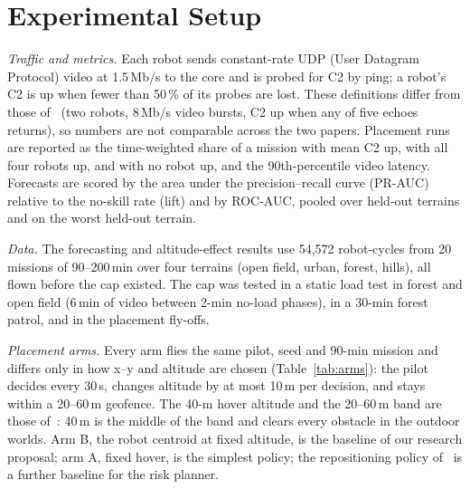 \section{Experimental Setup}
\label{sec:setup}

\textit{Traffic and metrics.} Each robot sends constant-rate UDP (User Datagram Protocol) video at
1.5\,Mb/s to the core and is probed for C2 by ping; a robot's C2 is up when
fewer than 50\,\% of its probes are lost. These definitions differ from those
of~\cite{makhubela2026satnac} (two robots, 8\,Mb/s video bursts, C2 up when
any of five echoes returns), so numbers are not comparable across the two
papers. Placement runs are reported as the time-weighted share of a mission
with mean C2 up, with all four robots up, and with no robot up, and the
90th-percentile video latency. Forecasts are scored by the area under the
precision--recall curve (PR-AUC) relative to the no-skill rate (lift) and by ROC-AUC, pooled over held-out terrains and on the
worst held-out terrain.

\textit{Data.} The forecasting and altitude-effect results use 54,572
robot-cycles from 20 missions of 90--200\,min over four terrains (open field,
urban, forest, hills), all flown before the cap existed. The cap was tested in
a static load test in forest and open field (6\,min of video between 2-min
no-load phases), in a 30-min forest patrol, and in the placement fly-offs.

\textit{Placement arms.} Every arm flies the same pilot, seed and 90-min
mission and differs only in how x--y and altitude are chosen
(Table~\ref{tab:arms}): the pilot decides every 30\,s, changes altitude by at
most 10\,m per decision, and stays within a 20--60\,m geofence. The 40-m hover altitude and the
20--60\,m band are those of~\cite{makhubela2026satnac}: 40\,m is the middle of
the band and clears every obstacle in the outdoor worlds. Arm B, the
robot centroid at fixed altitude, is the baseline of our research proposal; arm
A, fixed hover, is the simplest policy; the repositioning policy
of~\cite{makhubela2026satnac} is a further baseline for the risk planner.

\begin{table}[t]
\caption{Placement Arms}
\label{tab:arms}
\centering
\small

\end{table}


